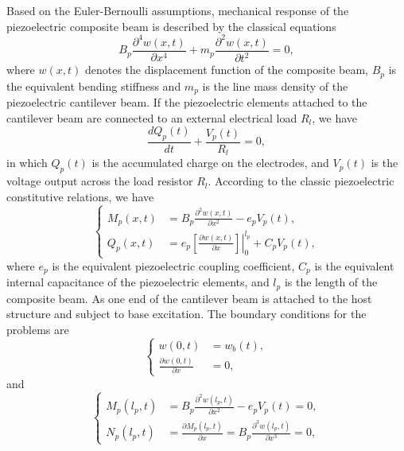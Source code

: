 \documentclass{svjour3}                     %
\begin{document}
Based on the Euler-Bernoulli assumptions, mechanical response of the piezoelectric composite beam is described by the classical equations
\begin{equation}
    B_p \frac{\partial^4 w(x,t)}{\partial x^4} + m_p \frac{\partial^2 w(x,t)}{\partial t^2} = 0,
\end{equation}
where $w(x,t)$ denotes the displacement function of the composite beam, $B_p$ is the equivalent bending stiffness and $m_p$ is the line mass density of the piezoelectric cantilever beam. If the piezoelectric elements attached to the cantilever beam are connected to an external electrical load $R_l$, we have 
\begin{equation}
    \frac{d Q_p(t)}{d t} + \frac{V_p(t)}{R_l} = 0,
\end{equation}
in which $Q_p(t)$ is the accumulated charge on the electrodes, and $V_p(t)$ is the voltage output across the load resistor $R_l$. According to the classic piezoelectric constitutive relations, we have 
\begin{equation}
    \left\{\begin{aligned}
        M_p(x,t) &= B_p \frac{\partial^2 w(x,t)}{\partial x^2} - e_p V_p(t), \\
        Q_p(x,t) &= e_p \left.\left[ \frac{\partial w(x,t)}{\partial x} \right]\right|_0^{l_p} + C_p V_p(t),
    \end{aligned}\right.
\end{equation}
where $e_p$ is the equivalent piezoelectric coupling coefficient, $C_p$ is the equivalent internal capacitance of the piezoelectric elements, and $l_p$ is the length of the composite beam. As one end of the cantilever beam is attached to the host structure and subject to base excitation. The boundary conditions for the problems are 
\begin{equation}
    \left\{\begin{aligned}
        w(0,t) &= w_b(t), \\
        \frac{\partial w(0,t)}{\partial x} &= 0,
    \end{aligned}\right.
\end{equation}
and
\begin{equation}
    \left\{\begin{aligned}
        M_p(l_p,t) &= B_p \frac{\partial^2 w(l_p,t)}{\partial x^2} - e_p V_p(t) = 0, \\
        N_p(l_p,t) &= \frac{\partial M_p(l_p,t)}{\partial x} = B_p \frac{\partial^3 w(l_p,t)}{\partial x^3} = 0,
    \end{aligned}\right.
\end{equation}
\end{document}
